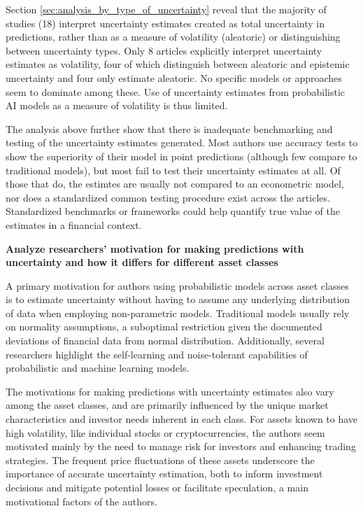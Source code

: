 Section \ref{sec:analysis_by_type_of_uncertainty} reveal that the majority of studies (18) interpret uncertainty estimates created as total uncertainty in predictions, rather than as a measure of volatility (aleatoric) or distinguishing between uncertainty types. Only 8 articles explicitly interpret uncertainty estimates as volatility, four of which distinguish between aleatoric and epistemic uncertainty and four only estimate aleatoric. No specific models or approaches seem to dominate among these. Use of uncertainty estimates from probabilistic AI models as a measure of volatility is thus limited. 

The analysis above further show that there is inadequate benchmarking and testing of the uncertainty estimates generated. Most authors use accuracy tests to show the superiority of their model in point predictions (although few compare to traditional models), but most fail to test their uncertainty estimates at all. Of those that do, the estimtes are usually not compared to an econometric model, nor does a standardized common testing procedure exist across the articles.  
Standardized benchmarks or frameworks could help quantify true value of the estimates in a financial context.

\textbf{Analyze researchers' motivation for making predictions with uncertainty and how it differs for different asset classes}\nopagebreak

A primary motivation for authors using probabilistic models across asset classes is to estimate uncertainty without having to assume any underlying distribution of data when employing non-parametric models. Traditional models usually rely on normality assumptions, a suboptimal restriction given the documented deviations of financial data from normal distribution. Additionally, several researchers highlight the self-learning and noise-tolerant capabilities of probabilistic and machine learning models.

The motivations for making predictions with uncertainty estimates also vary among the asset classes, and are primarily influenced by the unique market characteristics and investor needs inherent in each class. For assets known to have high volatility, like individual stocks or cryptocurrencies, the authors seem motivated mainly by the need to manage risk for investors and enhancing trading strategies. The frequent price fluctuations of these assets underscore the importance of accurate uncertainty estimation, both to inform investment decisions and mitigate potential losses or facilitate speculation, a main motivational factors of the authors. 

